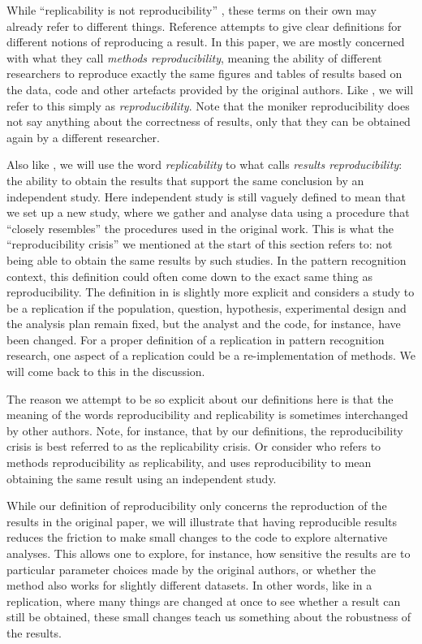 \documentclass[runningheads,a4paper]{llncs}\usepackage[]{graphicx}\usepackage[]{color}
\begin{document}
While ``replicability is not reproducibility'' \cite{Drummond2009}, these terms on their own may already refer to different things. Reference \cite{Goodman2016a} attempts to give clear definitions for different notions of reproducing a result. In this paper, we are mostly concerned with what they call \emph{methods reproducibility}, meaning the ability of different researchers to reproduce exactly the same figures and tables of results based on the data, code and other artefacts provided by the original authors. Like \cite{Patil2016}, we will refer to this simply as \emph{reproducibility}. Note that the moniker reproducibility does not say anything about the correctness of results, only that they can be obtained again by a different researcher.

Also like \cite{Patil2016}, we will use the word \emph{replicability} to what \cite{Goodman2016a} calls \emph{results reproducibility}: the ability to obtain the results that support the same conclusion by an independent study. Here independent study is still vaguely defined to mean that we set up a new study, where we gather and analyse data using a procedure that ``closely resembles'' the procedures used in the original work.  This is what the ``reproducibility crisis'' we mentioned at the start of this section refers to: not being able to obtain the same results by such studies. In the pattern recognition context, this definition could often come down to the exact same thing as reproducibility. The definition in \cite{Patil2016} is slightly more explicit and considers a study to be a replication if the population, question, hypothesis, experimental design and the analysis plan remain fixed, but the analyst and the code, for instance, have been changed. For a proper definition of a replication in pattern recognition research, one aspect of a replication could be a re-implementation of methods. We will come back to this in the discussion.

The reason we attempt to be so explicit about our definitions here is that the meaning of the words reproducibility and replicability is sometimes interchanged by other authors. Note, for instance, that by our definitions, the reproducibility crisis is best referred to as the replicability crisis. Or consider \cite{Drummond2009} who refers to methods reproducibility as replicability, and uses reproducibility to mean obtaining the same result using an independent study. 

While our definition of reproducibility only concerns the reproduction of the results in the original paper, we will illustrate that having reproducible results reduces the friction to make small changes to the code to explore alternative analyses. This allows one to explore, for instance, how sensitive the results are to particular parameter choices made by the original authors, or whether the method also works for slightly different datasets. In other words, like in a replication, where many things are changed at once to see whether a result can still be obtained, these small changes teach us something about the robustness of the results.
\end{document}
